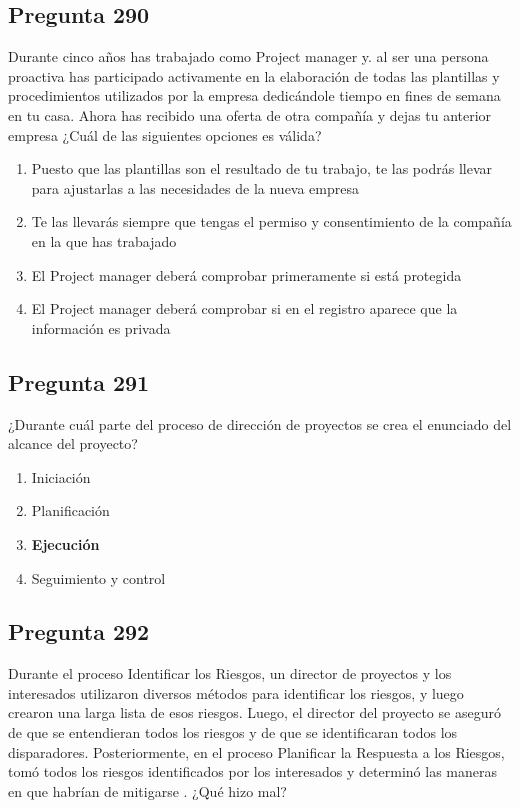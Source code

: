 \documentclass[11pt,a4paper]{article}
\begin{document}
\subsection*{Pregunta 290}
Durante cinco años has trabajado como Project manager y. al ser una persona proactiva has participado activamente en la elaboración de todas las plantillas y procedimientos utilizados por la empresa dedicándole tiempo en fines de semana en tu casa. Ahora has recibido una oferta de otra compañía y dejas tu anterior empresa ¿Cuál de las siguientes opciones es válida?

\begin{enumerate}[label=\alph*)]
  \item Puesto que las plantillas son el resultado de tu trabajo, te las podrás llevar para ajustarlas a las necesidades de la nueva empresa
  \item Te las llevarás siempre que tengas el permiso y consentimiento de la compañía en la que has trabajado
  \item El Project manager deberá comprobar primeramente si está protegida
  \item El Project manager deberá comprobar si en el registro aparece que la información es privada
\end{enumerate}

\subsection*{Pregunta 291}
¿Durante cuál parte del proceso de dirección de proyectos se crea el enunciado del alcance del proyecto?

\begin{enumerate}[label=\alph*)]
  \item Iniciación
  \item Planificación
  \item \textbf{Ejecución}
  \item Seguimiento y control
\end{enumerate}

\subsection*{Pregunta 292}
Durante el proceso Identificar los Riesgos, un director de proyectos y los interesados utilizaron diversos métodos para identificar los riesgos, y luego crearon una larga lista de esos riesgos. Luego, el director del proyecto se aseguró de que se entendieran todos los riesgos y de que se identificaran todos los disparadores. Posteriormente, en el proceso Planificar la Respuesta a los Riesgos, tomó todos los riesgos identificados por los interesados y determinó las maneras en que habrían de mitigarse . ¿Qué hizo mal?
\end{document}
